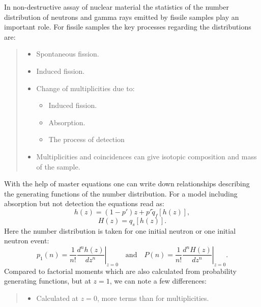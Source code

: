 \documentclass[landscape,a0,final,a4resizeable]{a0poster}
\newenvironment{poster}{
  \begin{center}
  \begin{minipage}[c]{0.98\textwidth}
}{
  \end{minipage}
  \end{center}
}
\begin{document}
\begin{poster}
\begin{multicols}{4}
In non-destructive assay of nuclear material the statistics of the
number distribution of neutrons and gamma rays emitted by fissile
samples play an important role. For fissile samples the key
processes regarding the distributions are: \vspace{5mm}
\begin{quote}
\begin{itemize}
    \item Spontaneous fission. \par

    \item Induced fission.

    \item Change of multiplicities due to:
    \begin{itemize}

    \item Induced fission.

    \item Absorption.

    \item The process of detection
\end{itemize}

    \item Multiplicities and coincidences can give isotopic composition and mass of the sample.
\end{itemize}
\end{quote}
\vspace{5mm} With the help of master equations one can write down
relationships describing the generating functions of the number
distribution. For a model including absorption but not detection
the equations read as:
\begin{equation}
\label{eq:hz} h(z)=(1-p')z+ p' \widetilde{q}_f[h(z)],
\end{equation}
\begin{equation}
\label{eq:Hz} H(z)=q_s[h(z)].
\end{equation}
Here the number distribution is taken for one initial neutron or
one initial neutron event:
\begin{equation}
\label{eq:probp} p_1(n) = \left.\frac{1}{n!}
\frac{d^{n}h(z)}{dz^{n}} \right|_{z=0} \quad \mbox{and} \quad P(n)
= \left.\frac{1}{n!} \frac{d^{n}H(z)}{dz^{n}} \right|_{z=0}.
\end{equation}
Compared to factorial moments which are also calculated from
probability generating functions, but at $z=1$, we can note a few
differences: \vspace{5mm}
\begin{quote}
\begin{itemize}
\item Calculated at $z=0$, more terms than for multiplicities.


\end{itemize}
\end{quote}
\end{multicols}
\end{poster}
\end{document}
